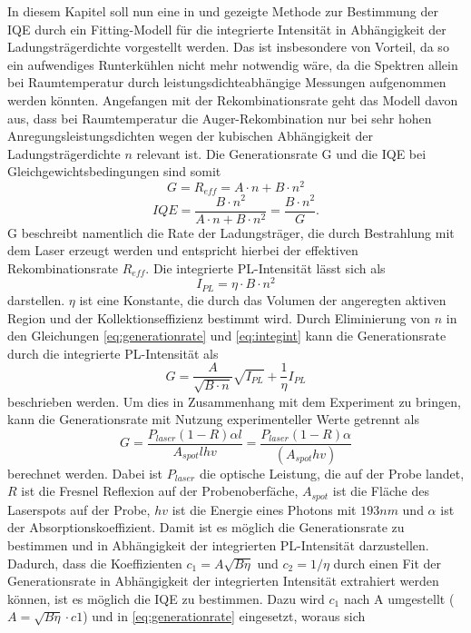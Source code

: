 \noindent
In diesem Kapitel soll nun eine in \cite{doi:10.1063/1.3100773} und \cite{doi:10.1063/1.4917540} gezeigte Methode zur Bestimmung der IQE durch ein Fitting-Modell für die integrierte Intensität in Abhängigkeit der Ladungsträgerdichte vorgestellt werden. Das ist insbesondere von Vorteil, da so ein aufwendiges Runterkühlen nicht mehr notwendig wäre, da die Spektren allein bei Raumtemperatur durch leistungsdichteabhängige Messungen aufgenommen werden könnten. 
\newline
Angefangen mit der Rekombinationsrate geht das Modell davon aus,
dass bei Raumtemperatur die Auger-Rekombination nur bei sehr hohen Anregungsleistungsdichten wegen der kubischen Abhängigkeit der Ladungsträgerdichte $n$ relevant ist. Die Generationsrate G und die IQE bei Gleichgewichtsbedingungen sind somit
\begin{equation}
    G = R_{eff} = A \cdot n + B \cdot n^2
    \label{eq:generationrate}
\end{equation}  
\begin{equation}
    IQE = \frac{B\cdot n^2}{A \cdot n + B \cdot n^2} = \frac{B\cdot n^2}{G}.
    \label{eq:iqe2}
\end{equation}  
G beschreibt namentlich die Rate der Ladungsträger, die durch Bestrahlung mit dem Laser erzeugt werden und entspricht hierbei der effektiven Rekombinationsrate $R_{eff}$.
Die integrierte PL-Intensität lässt sich als 
\begin{equation}
    I_{PL} = \eta \cdot B \cdot n^2
    \label{eq:integint}
\end{equation} 
darstellen. $\eta$ ist eine Konstante, die durch das Volumen der angeregten aktiven Region und der Kollektionseffizienz bestimmt wird. Durch Eliminierung von $n$ in den Gleichungen \ref{eq:generationrate} und \ref{eq:integint} kann die Generationsrate durch die integrierte PL-Intensität als
\begin{equation}
    G = \frac{A}{\sqrt{B\cdot n}}\sqrt{I_{PL}} + \frac{1}{\eta} I_{PL}
\end{equation} 
beschrieben werden. Um dies in Zusammenhang mit dem Experiment zu bringen, kann die Generationsrate mit Nutzung experimenteller Werte getrennt als
\begin{equation}
    G = \frac{P_{laser} (1-R)\alpha l}{A_{spot} l h v} = \frac{P_{laser}(1-R) \alpha }{ (A_{spot} h v)}
\end{equation} berechnet werden.
Dabei ist $P_{laser}$ die optische Leistung, die auf der Probe landet, $R$ ist die Fresnel Reflexion auf der Probenoberfäche, $A_{spot}$ ist die Fläche des Laserspots auf der Probe, $h v$ ist die Energie eines Photons mit $193 nm$ und $\alpha$ ist der Absorptionskoeffizient. Damit ist es möglich die Generationsrate zu bestimmen und in Abhängigkeit der integrierten PL-Intensität darzustellen. Dadurch, dass die Koeffizienten $c_1 = A \sqrt{B  \eta}$ und $c_2 = 1 / \eta$ durch einen Fit der Generationsrate in Abhängigkeit der integrierten Intensität extrahiert werden können, ist es möglich die IQE zu bestimmen. Dazu wird $c_1$ nach A umgestellt ($A = \sqrt{B \eta} \cdot c1$) und in \ref{eq:generationrate} eingesetzt, woraus sich 

